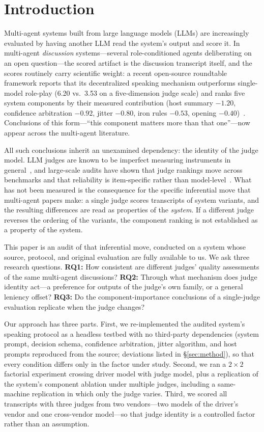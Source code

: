 \section{Introduction}

Multi-agent systems built from large language models (LLMs) are
increasingly evaluated by having another LLM read the system's output
and score it. In multi-agent \emph{discussion} systems---several
role-conditioned agents deliberating on an open question---the scored
artifact is the discussion transcript itself, and the scores routinely
carry scientific weight: a recent open-source roundtable framework
reports that its decentralized speaking mechanism outperforms
single-model role-play (6.20 vs.\ 3.53 on a five-dimension judge scale)
and ranks five system components by their measured contribution
(host summary $-1.20$, confidence arbitration $-0.92$, jitter $-0.80$,
iron rules $-0.53$, opening $-0.40$)~\cite{whospeaks2024}. Conclusions
of this form---``this component matters more than that one''---now
appear across the multi-agent literature.

All such conclusions inherit an unexamined dependency: the identity of
the judge model. LLM judges are known to be imperfect measuring
instruments in general~\cite{zheng2023judging,wang2024canyoutrust},
and large-scale audits have shown that judge rankings move across
benchmarks and that reliability is item-specific rather than
model-level~\cite{reliability2026,allverdicts2026}. What has not been
measured is the consequence for the specific inferential move that
multi-agent papers make: a single judge scores transcripts of system
variants, and the resulting differences are read as properties of the
\emph{system}. If a different judge reverses the ordering of the
variants, the component ranking is not established as a property of the
system.

This paper is an audit of that inferential move, conducted on a system
whose source, protocol, and original evaluation are fully available to
us. We ask three research questions. \textbf{RQ1:} How consistent are
different judges' quality assessments of the same multi-agent
discussions? \textbf{RQ2:} Through what mechanism does judge identity
act---a preference for outputs of the judge's own family, or a general
leniency offset? \textbf{RQ3:} Do the component-importance conclusions
of a single-judge evaluation replicate when the judge changes?

Our approach has three parts. First, we re-implemented the audited
system's speaking protocol as a headless testbed with no third-party
dependencies (system prompt, decision schema, confidence arbitration,
jitter algorithm, and host prompts reproduced from the source;
deviations listed in \S\ref{sec:method}), so that every condition
differs only in the factor under study. Second, we ran a $2\times2$
factorial experiment crossing driver model with judge model, plus a
replication of the system's component ablation under multiple judges,
including a same-machine replication in which only the judge varies.
Third, we scored all transcripts with three judges from two
vendors---two models of the driver's vendor and one cross-vendor
model---so that judge identity is a controlled factor rather than an
assumption.

